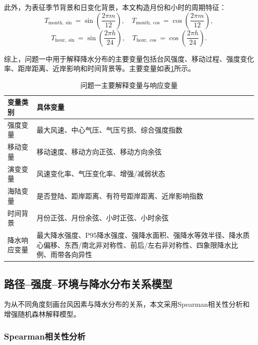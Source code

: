 \documentclass[UTF8,a4paper,zihao=5]{ctexart}
\numberwithin{equation}{section}
\numberwithin{figure}{section}
\numberwithin{table}{section}
\begin{document}
此外，为表征季节背景和日变化背景，本文构造月份和小时的周期特征：
\begin{equation}
    T_{\mathrm{month},\sin}=\sin\left(\frac{2\pi m}{12}\right),\quad
    T_{\mathrm{month},\cos}=\cos\left(\frac{2\pi m}{12}\right),
\end{equation}
\begin{equation}
    T_{\mathrm{hour},\sin}=\sin\left(\frac{2\pi h}{24}\right),\quad
    T_{\mathrm{hour},\cos}=\cos\left(\frac{2\pi h}{24}\right).
\end{equation}

综上，问题一中用于解释降水分布的主要变量包括台风强度、移动过程、强度变化率、距岸距离、近岸影响和时间背景等。主要变量如表\ref{tab:variables_problem1}所示。

\begin{table}[htbp]
    \centering
    \caption{问题一主要解释变量与响应变量}
    \label{tab:variables_problem1}
    \begin{tabular}{p{}p{}}
        \hline
        变量类别 & 具体变量 \\
        \hline
        强度变量 & 最大风速、中心气压、气压亏损、综合强度指数 \\
        移动变量 & 移动速度、移动方向正弦、移动方向余弦 \\
        演变变量 & 风速变化率、气压变化率、增强/减弱状态 \\
        海陆变量 & 是否登陆、距岸距离、有符号距岸距离、近岸影响指数 \\
        时间背景 & 月份正弦、月份余弦、小时正弦、小时余弦 \\
        降水响应变量 & 最大降水强度、P95降水强度、强降水面积、强降水等效半径、降水质心偏移、东西/南北非对称性、前后/左右非对称性、四象限降水比例、雨带各向异性 \\
        \hline
    \end{tabular}
\end{table}

\subsection{路径--强度--环境与降水分布关系模型}

为从不同角度刻画台风因素与降水分布的关系，本文采用Spearman相关性分析和增强随机森林解释模型。

\subsubsection{Spearman相关性分析}
\end{document}
